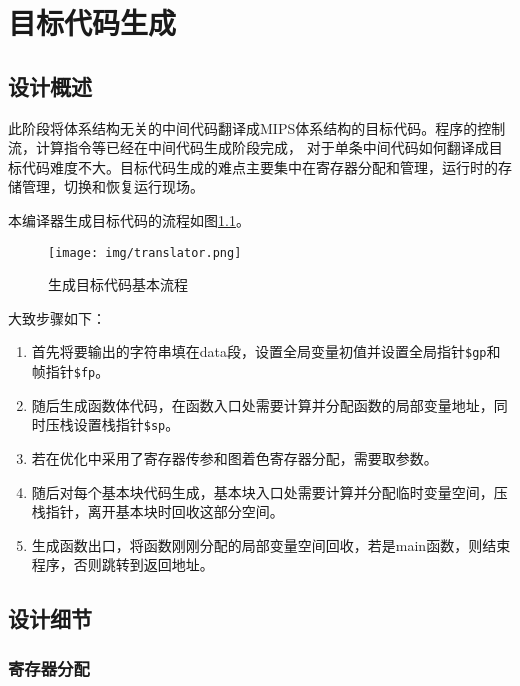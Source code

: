 \chapter{目标代码生成}
\section{设计概述}

此阶段将体系结构无关的中间代码翻译成MIPS体系结构的目标代码。程序的控制流，计算指令等已经在中间代码生成阶段完成，
对于单条中间代码如何翻译成目标代码难度不大。目标代码生成的难点主要集中在寄存器分配和管理，运行时的存储管理，切换和恢复运行现场。

本编译器生成目标代码的流程如图\ref{fig:translator}。

\begin{figure}[htbp]
	\centering
	\texttt{[image: img/translator.png]}
	\caption{生成目标代码基本流程}
	\label{fig:translator}
\end{figure}

大致步骤如下：
\begin{enumerate}
    \item 首先将要输出的字符串填在data段，设置全局变量初值并设置全局指针\texttt{\$gp}和帧指针\texttt{\$fp}。
    \item 随后生成函数体代码，在函数入口处需要计算并分配函数的局部变量地址，同时压栈设置栈指针\texttt{\$sp}。
    \item 若在优化中采用了寄存器传参和图着色寄存器分配，需要取参数。
    \item 随后对每个基本块代码生成，基本块入口处需要计算并分配临时变量空间，压栈指针，离开基本块时回收这部分空间。
    \item 生成函数出口，将函数刚刚分配的局部变量空间回收，若是main函数，则结束程序，否则跳转到返回地址。
\end{enumerate}

\section{设计细节}

\subsection{寄存器分配}

